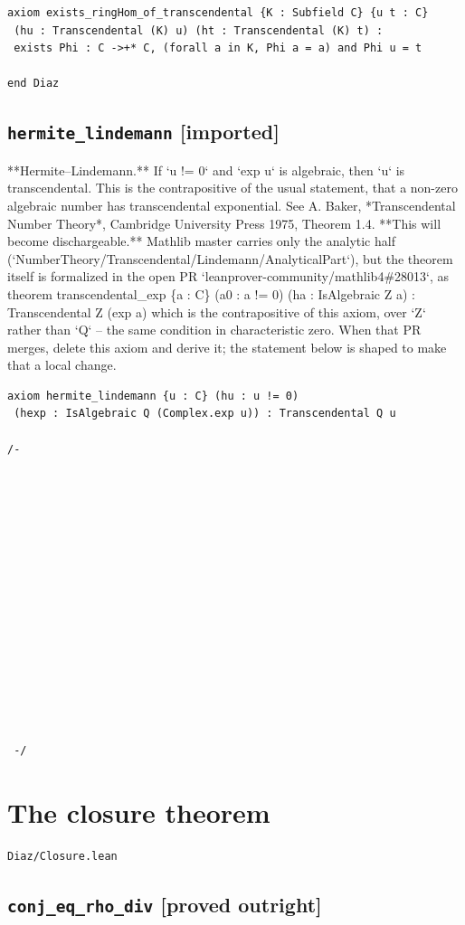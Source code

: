 \documentclass[11pt,a4paper]{article}
\newcommand{\tagax}{\textcolor{axc}{\textbf{[imported]}}}
\newcommand{\tagpr}{\textcolor{provedc}{\textbf{[proved outright]}}}
\begin{document}
\begin{lstlisting}
axiom exists_ringHom_of_transcendental {K : Subfield C} {u t : C}
 (hu : Transcendental (K) u) (ht : Transcendental (K) t) :
 exists Phi : C ->+* C, (forall a in K, Phi a = a) and Phi u = t

end Diaz
\end{lstlisting}

\subsection*{\texttt{hermite\_lindemann} \hfill \tagax}

**Hermite--Lindemann.** If `u != 0` and `exp u` is algebraic, then `u` is transcendental. This is the contrapositive of the usual statement, that a non-zero algebraic number has transcendental exponential. See A. Baker, *Transcendental Number Theory*, Cambridge University Press 1975, Theorem 1.4. **This will become dischargeable.** Mathlib master carries only the analytic half (`NumberTheory/Transcendental/Lindemann/AnalyticalPart`), but the theorem itself is formalized in the open PR `leanprover-community/mathlib4\#28013`, as theorem transcendental\_exp \{a : C\} (a0 : a != 0) (ha : IsAlgebraic Z a) : Transcendental Z (exp a) which is the contrapositive of this axiom, over `Z` rather than `Q` -- the same condition in characteristic zero. When that PR merges, delete this axiom and derive it; the statement below is shaped to make that a local change.

\begin{lstlisting}
axiom hermite_lindemann {u : C} (hu : u != 0)
 (hexp : IsAlgebraic Q (Complex.exp u)) : Transcendental Q u

/- 
 
 

 
 
 
 
 
 

 
 
 
 

 
 -/
\end{lstlisting}

\section{The closure theorem}
\noindent\texttt{Diaz/Closure.lean}


\subsection*{\texttt{conj\_eq\_rho\_div} \hfill \tagpr}
\end{document}
